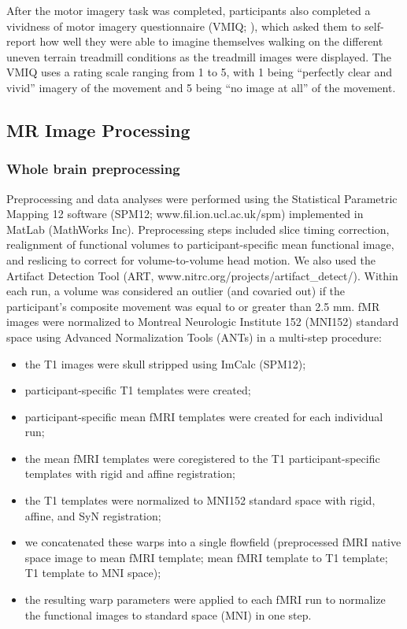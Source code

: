 \documentclass[a4paper,fleqn]{cas-sc}
\begin{document}
After the motor imagery task was completed, participants also completed a vividness of motor imagery questionnaire (VMIQ; \citealp{Isaac1986}), which asked them to self-report how well they were able to imagine themselves walking on the different uneven terrain treadmill conditions as the treadmill images were displayed. The VMIQ uses a rating scale ranging from 1 to 5, with 1 being “perfectly clear and vivid” imagery of the movement and 5 being “no image at all” of the movement.

\subsection{MR Image Processing}
\subsubsection{Whole brain preprocessing}
Preprocessing and data analyses were performed using the Statistical Parametric Mapping 12 software (SPM12; www.fil.ion.ucl.ac.uk/spm) implemented in MatLab (MathWorks Inc). Preprocessing steps included slice timing correction, realignment of functional volumes to participant-specific mean functional image, and reslicing to correct for volume-to-volume head motion. We also used the Artifact Detection Tool (ART, www.nitrc.org/projects/artifact\_detect/). Within each run, a volume was considered an outlier (and covaried out) if the participant’s composite movement was equal to or greater than 2.5 mm. fMR images were normalized to Montreal Neurologic Institute 152 (MNI152) standard space using Advanced Normalization Tools (ANTs) \citep{Avants2011} in a multi-step procedure:
\begin{itemize}
    \item the T1 images were skull stripped using ImCalc (SPM12);
    \item participant-specific T1 templates were created;
    \item participant-specific mean fMRI templates were created for each individual run;
    \item the mean fMRI templates were coregistered to the T1 participant-specific templates with rigid and affine registration;
    \item the T1 templates were normalized to MNI152 standard space with rigid, affine, and SyN registration;
    \item we concatenated these warps into a single flowfield (preprocessed fMRI native space image to mean fMRI template; mean fMRI template to T1 template; T1 template to MNI space);
    \item the resulting warp parameters were applied to each fMRI run to normalize the functional images to standard space (MNI) in one step.
\end{itemize}
\end{document}
